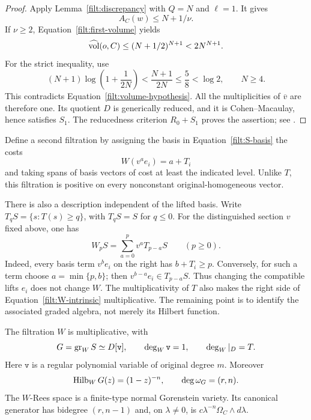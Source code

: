\begin{proof}
Apply Lemma~\ref{filt:discrepancy} with $Q=N$ and $\ell=1$.  It gives
\[
 A_C(w)\leq N+1/\nu.
\]
If $\nu\geq2$, Equation~\eqref{filt:first-volume} yields
\[
 \widehat{\operatorname{vol}}(o,C)\leq (N+1/2)^{N+1}<2N^{N+1}.
\]
For the strict inequality, use
\[
 (N+1)\log\left(1+\frac1{2N}\right)
 <\frac{N+1}{2N}\leq\frac58<\log2,
 \qquad N\geq4.
\]
This contradicts Equation~\eqref{filt:volume-hypothesis}.  All the
multiplicities of $\overline v$ are therefore one.  Its quotient $D$ is
generically reduced, and it is Cohen--Macaulay, hence satisfies $S_1$.
The reducedness criterion $R_0+S_1$ proves the assertion; see
\cite[Tag~033P]{StacksProject}.
\end{proof}

Define a second filtration by assigning the basis in
Equation~\eqref{filt:S-basis} the costs
\begin{equation}\label{filt:W-definition}
 W(v^a e_i)=a+T_i
\end{equation}
and taking spans of basis vectors of cost at least the indicated level.
Unlike $T$, this filtration is positive on every nonconstant
original-homogeneous vector.

There is also a description independent of the lifted basis. Write
$T_qS=\{s:T(s)\ge q\}$, with $T_qS=S$ for $q\le0$.
For the distinguished section $v$ fixed above, one has
\begin{equation}\label{filt:W-intrinsic}
 W_pS=\sum_{a=0}^{p}v^aT_{p-a}S\qquad(p\ge0).
\end{equation}
Indeed, every basis term $v^be_i$ on the right has
$b+T_i\ge p$. Conversely, for such a term choose
$a=\min\{p,b\}$; then $v^{b-a}e_i\in T_{p-a}S$.
Thus changing the compatible lifts $e_i$ does not change $W$.
The multiplicativity of $T$ also makes the right side of
Equation~\eqref{filt:W-intrinsic} multiplicative. The remaining
point is to identify the associated graded algebra, not merely
its Hilbert function.

\begin{proposition}\label{filt:structure}
The filtration $W$ is multiplicative, with
\begin{equation}\label{filt:second-graded}
 G=\operatorname{gr}_WS\simeq D[\mathtt v],\qquad
 \deg_W\mathtt v=1,\qquad \deg_W|_D=T.
\end{equation}
Here $\mathtt v$ is a regular polynomial variable of original degree
$m$.  Moreover
\begin{equation}\label{filt:G-series}
 \operatorname{Hilb}_WG(z)=(1-z)^{-n},\qquad
 \deg\omega_G=(r,n).
\end{equation}
The $W$-Rees space is a finite-type normal Gorenstein variety.  Its
canonical generator has bidegree $(r,n-1)$ and, on $\lambda\ne0$, is
$c\lambda^{-n}\Omega_C\wedge d\lambda$.
\end{proposition}


